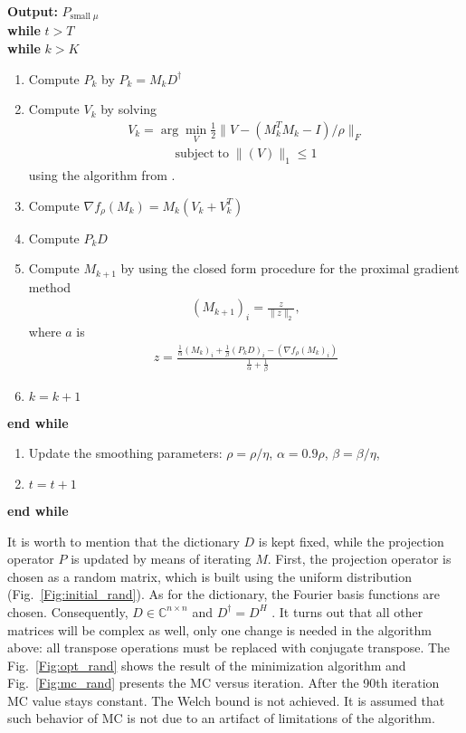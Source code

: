 \documentclass[journal]{IEEEtran}
\begin{document}
\textbf{Output:} $P_{\textrm{small}\;\mu}$\\
\textbf{while} $t>T$ \\
\textbf{while} $k>K$ 
\begin{enumerate}
     \item Compute $P_k$ by $P_k=M_kD^{\dag}$
    \item Compute $V_k$ by solving 
\begin{align}
V_k=\arg\min_{V}\frac{1}{2}\| V-(M_k^TM_k-I)/\rho  \|_F
\end{align}
\begin{align}
\textrm{subject}\;\textrm{to} \;\|(V)\|_1\leq1
\end{align}
using the algorithm from \cite{l1_ball}.
    \item Compute $\nabla f_{\rho}(M_k)=M_k(V_k+V^T_k)$
    \item Compute $P_kD$
    \item Compute $M_{k+1}$ by using the closed form procedure for the proximal gradient method 
\begin{align}
(M_{k+1})_i=\frac{z}{\|z\|_2},
\end{align}
where $a$ is
\begin{align}
    z = \frac{\frac{1}{\alpha}(M_k)_i + \frac{1}{\beta}(P_k D)_i - (\nabla f_{\rho}( M_k)_i)}{\frac{1}{\alpha}+\frac{1}{\beta}}
\end{align}
    \item $k=k+1$
\end{enumerate}
\textbf{end while}
\begin{enumerate}
    \item Update the smoothing parameters: $\rho=\rho/\eta$, $\alpha=0.9\rho$, $\beta=\beta/\eta$,
    \item $t=t+1$
\end{enumerate}
\textbf{end while}


It is worth to mention that the dictionary $D$ is kept fixed, while the projection operator $P$ is updated by means of iterating $M$. First, the projection operator is chosen as a random matrix, which is built using the uniform distribution (Fig.~\ref{Fig:initial_rand}). As for the dictionary, the Fourier basis functions are chosen. Consequently, $D\in\mathbb{C}^{n\times n}$ and $D^{\dag}=D^{H}$ . It turns out that all other matrices will be complex as well, only one change is needed in the algorithm above: all transpose operations must be replaced with conjugate transpose. The Fig.~\ref{Fig:opt_rand} shows the result of the minimization algorithm and Fig.~\ref{Fig:mc_rand} presents the MC versus iteration. After the 90th iteration MC value stays constant. The Welch bound is not achieved. It is assumed that such behavior of MC is not due to an artifact of limitations of the algorithm. 
\end{document}
